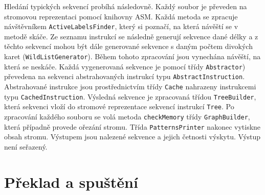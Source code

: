 Hledání typických sekvencí probíhá následovně. Každý soubor je převeden na stromovou reprezentaci pomocí knihovny ASM. Každá metoda se zpracuje návštěvníkem \texttt{ActiveLabelsFinder}, který si poznačí, na která návěští se v metodě skáče. Ze seznamu instrukcí se následně generují sekvence dané délky a z těchto sekvencí mohou být dále generované sekvence s daným počtem divokých karet (\texttt{WildListGenerator}). Během tohoto zpracování jsou vynechána návěští, na která se neskáče. Každá vygenerovaná sekvence je pomocí třídy \texttt{Abstractor}) převedena na sekvenci abstrahovaných instrukcí typu \texttt{AbstractInstruction}. Abstrahované instrukce jsou prostřednictvím třídy \texttt{Cache} nahrazeny instrukcemi typu \texttt{CachedInstruction}. Výsledná sekvence je zpracovaná třídou \texttt{TreeBuilder}, která sekvenci vloží do stromové reprezentace sekvencí instrukcí \texttt{Tree}. Po zpracování každého souboru se volá metoda \texttt{checkMemory} třídy \texttt{GraphBuilder}, která případně provede ořezání stromu. Třída \texttt{PatternsPrinter} nakonec vytiskne obsah stromu. Výstupem jsou nalezené sekvence a jejich četnosti výskytu. Výstup není seřazený.

\section{Překlad a spuštění}\label{ToolRun}

